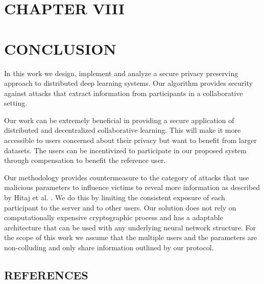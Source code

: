 \documentclass[letterpaper]{article}
\begin{document}
\begin{flushleft}
{\pagebreak
\section*{CHAPTER VIII}
\vspace{0.25in}
\section{CONCLUSION}

In this work we design, implement and analyze a secure privacy preserving approach to distributed deep learning systems.  Our
algorithm provides security against attacks that extract information from participants in a collaborative setting. 

Our work can be extremely beneficial in providing a secure application of distributed and decentralized collaborative learning. This
will make it more accessible to users concerned about their privacy but want to benefit from larger datasets. The users can be incentivized to participate in our proposed system through compensation to benefit the reference user.

Our methodology provides countermeasure to the category of attacks that use malicious parameters to influence victims to reveal more
information as described  by Hitaj  et al. \cite{hitaj2017deep} . We do this by limiting the consistent exposure of each participant to
the server and to other users. Our solution does not rely on computationally expensive cryptographic process and has a adaptable
architecture that can be used with any underlying neural network structure. For the scope of this work we assume that the multiple
users and the parameters are non-colluding and only share information outlined by our protocol. 

\newpage

\begin{center}
\vspace*{\fill}
\section*{\normalfont REFERENCES}
\vspace*{\fill}
\end{center}

\newpage



}

\end{flushleft}
\end{document}
